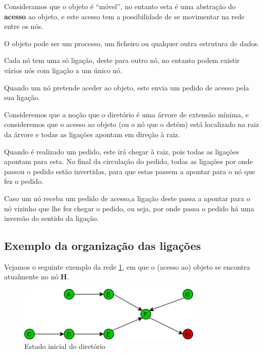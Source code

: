 Consideramos que o objeto é ``móvel'', no entanto esta é uma abstração do \textbf{acesso} ao objeto, e este acesso tem a possibilidade de se movimentar na rede entre os nós.

O objeto pode ser um processo, um ficheiro ou qualquer outra estrutura de dados.

Cada nó tem uma só ligação, deste para outro nó, no entanto podem existir vários nós com ligação a um único nó.


Quando um nó pretende aceder ao objeto, este envia um pedido de acesso pela sua ligação. 



Consideremos que a noção que o diretório é uma árvore de extensão mínima, e consideremos que o acesso ao objeto (ou o nó que o detém) está localizado na raiz da árvore e todas as ligações apontam em direção à raiz.

Quando é realizado um pedido, este irá chegar à raiz, pois todas as ligações apontam para esta. No final da circulação do pedido, todas as ligações por onde passou o pedido estão invertidas, para que estas passem a apontar para o nó que fez o pedido.

Caso um nó receba um pedido de acesso,a ligação deste passa a apontar para o nó vizinho que lhe fez chegar o pedido, ou seja, por onde passa o pedido há uma inversão do sentido da ligação.



\subsection*{Exemplo da organização das ligações}

Vejamos o seguinte exemplo da rede \ref{motivacao:img:estado_inicial}, em que o (acesso ao) objeto se encontra atualmente no nó \textbf{H}.


\begin{figure}[!htb]
\centering
\includegraphics[width=250pt]{um_pedido_1.png}
\caption{Estado inicial do diretório}
\label{motivacao:img:estado_inicial}
\end{figure}

